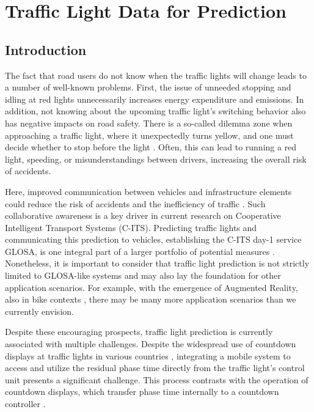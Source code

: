 \chapter{Traffic Light Data for Prediction}\label{ch:prediction}


\section{Introduction}

The fact that road users do not know when the traffic lights will change leads to a number of well-known problems. First, the issue of unneeded stopping and idling at red lights unnecessarily increases energy expenditure and emissions. In addition, not knowing about the upcoming traffic light's switching behavior also has negative impacts on road safety. There is a so-called dilemma zone when approaching a traffic light, where it unexpectedly turns yellow, and one must decide whether to stop before the light \cite{zhang_yellow_2014, suzuki_new_2018}. Often, this can lead to running a red light, speeding, or misunderstandings between drivers, increasing the overall risk of accidents.

Here, improved communication between vehicles and infrastructure elements could reduce the risk of accidents and the inefficiency of traffic \cite{sun_optimal_2020}. Such collaborative awareness is a key driver in current research on Cooperative Intelligent Transport Systems (C-ITS). Predicting traffic lights and communicating this prediction to vehicles, establishing the C-ITS day-1 service GLOSA, is one integral part of a larger portfolio of potential measures \cite{mellegard_day_2020}. Nonetheless, it is important to consider that traffic light prediction is not strictly limited to GLOSA-like systems and may also lay the foundation for other application scenarios. For example, with the emergence of Augmented Reality, also in bike contexts \cite{matviienko_bikear_2022, kosch_notibike_2022}, there may be many more application scenarios than we currently envision.

Despite these encouraging prospects, traffic light prediction is currently associated with multiple challenges. Despite the widespread use of countdown displays at traffic lights in various countries \cite{nygardhs_cyclists_2021}, integrating a mobile system to access and utilize the residual phase time directly from the traffic light's control unit presents a significant challenge. This process contrasts with the operation of countdown displays, which transfer phase time internally to a countdown controller \cite{islam_improved_2016}.

